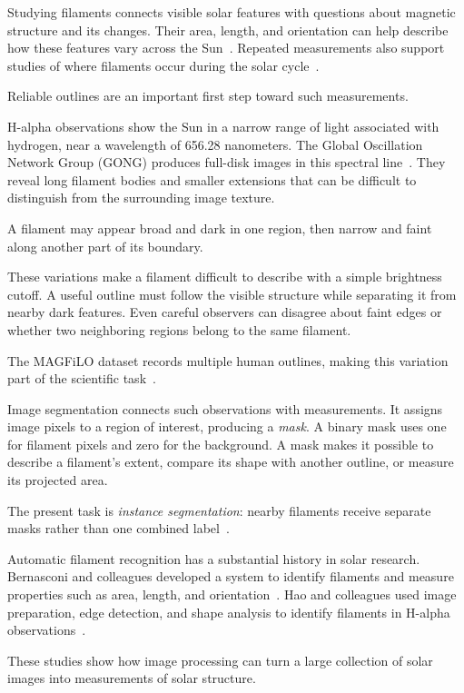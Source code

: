 \documentclass[sigconf]{acmart}
\begin{document}
Studying filaments connects visible solar features with questions about magnetic structure and its changes.
Their area, length, and orientation can help describe how these features vary across the Sun~\cite{bernasconi2005}.
Repeated measurements also support studies of where filaments occur during the solar cycle~\cite{hao2013}.

Reliable outlines are an important first step toward such measurements.

H-alpha observations show the Sun in a narrow range of light associated with hydrogen, near a wavelength of 656.28 nanometers.
The Global Oscillation Network Group (GONG) produces full-disk images in this spectral line~\cite{nsogong}.
They reveal long filament bodies and smaller extensions that can be difficult to distinguish from the surrounding image texture.

A filament may appear broad and dark in one region, then narrow and faint along another part of its boundary.

These variations make a filament difficult to describe with a simple brightness cutoff.
A useful outline must follow the visible structure while separating it from nearby dark features.
Even careful observers can disagree about faint edges or whether two neighboring regions belong to the same filament.

The MAGFiLO dataset records multiple human outlines, making this variation part of the scientific task~\cite{ahmadzadeh2024dataset}.

Image segmentation connects such observations with measurements. It assigns image pixels to a region of interest, producing a \emph{mask}.
A binary mask uses one for filament pixels and zero for the background.
A mask makes it possible to describe a filament's extent, compare its shape with another outline, or measure its projected area.

The present task is \emph{instance segmentation}: nearby filaments receive separate masks rather than one combined label~\cite{kirillov2019}.

Automatic filament recognition has a substantial history in solar research.
Bernasconi and colleagues developed a system to identify filaments and measure properties such as area, length, and orientation~\cite{bernasconi2005}.
Hao and colleagues used image preparation, edge detection, and shape analysis to identify filaments in H-alpha observations~\cite{hao2013}.

These studies show how image processing can turn a large collection of solar images into measurements of solar structure.
\end{document}
